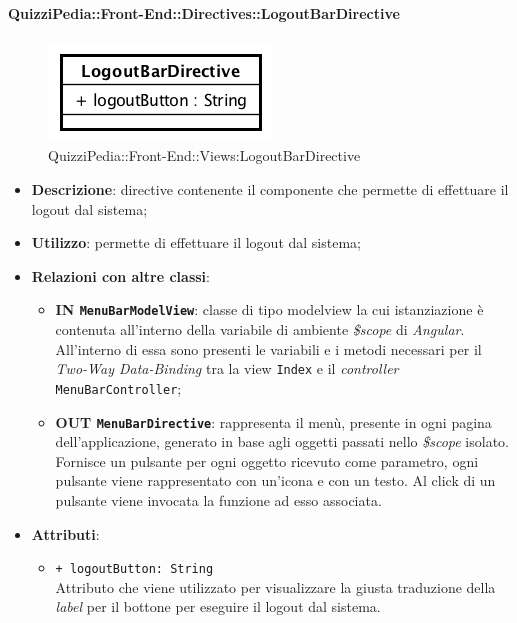 \paragraph{QuizziPedia::Front-End::Directives::LogoutBarDirective}

\label{QuizziPedia::Front-End::Directives::LogoutBarDirective}
\begin{figure} [ht]
	\centering
	\includegraphics[scale=0.80]{UML/Classi/Front-End/QuizziPedia_Front-end_Directives_LogoutBarDirective.png}
	\caption{QuizziPedia::Front-End::Views:LogoutBarDirective}
\end{figure} \FloatBarrier
\begin{itemize}
	\item \textbf{Descrizione}: directive contenente il componente che permette di effettuare il logout dal sistema;
	\item \textbf{Utilizzo}: permette di effettuare il logout dal sistema;
	\item \textbf{Relazioni con altre classi}:
	\begin{itemize}
		\item \textbf{IN \texttt{MenuBarModelView}}: classe di tipo modelview la cui istanziazione è contenuta all'interno della variabile di ambiente \textit{\$scope} di \textit{Angular}. All'interno di essa sono presenti le variabili e i metodi necessari per il \textit{Two-Way Data-Binding} tra la view \texttt{Index} e il \textit{controller} \texttt{MenuBarController};
		\item \textbf{OUT \texttt{MenuBarDirective}}: rappresenta il menù, presente in ogni pagina dell'applicazione, generato in base agli oggetti passati nello \textit{\$scope} isolato. Fornisce un pulsante per ogni oggetto ricevuto come parametro, ogni pulsante viene rappresentato con un’icona e con un testo. Al click di un pulsante viene invocata la funzione ad esso associata.  
	\end{itemize}
	\item \textbf{Attributi}:
	\begin{itemize}
		\item \texttt{+ logoutButton: String} \\ Attributo che viene utilizzato per visualizzare la giusta traduzione della \textit{label} per il bottone per eseguire il logout dal sistema.
	\end{itemize}
\end{itemize}